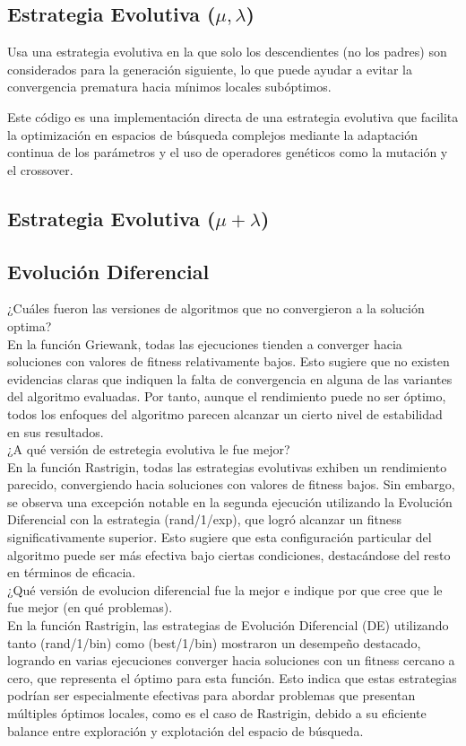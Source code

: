 \documentclass{report}
\begin{document}
\subsection{Estrategia Evolutiva ($\mu , \lambda$)}
Usa una estrategia evolutiva en la que solo los descendientes (no los padres) son considerados para la generación siguiente, lo que puede ayudar a evitar la convergencia prematura hacia mínimos locales subóptimos.

Este código es una implementación directa de una estrategia evolutiva que facilita la optimización en espacios de búsqueda complejos mediante la adaptación continua de los parámetros y el uso de operadores genéticos como la mutación y el crossover.
\subsection{Estrategia Evolutiva ($\mu + \lambda$)}


\subsection{Evolución Diferencial}


¿Cuáles fueron las versiones de algoritmos que no convergieron a la solución optima?\\
En la función Griewank, todas las ejecuciones tienden a converger hacia soluciones con valores de fitness relativamente bajos. Esto sugiere que no existen evidencias claras que indiquen la falta de convergencia en alguna de las variantes del algoritmo evaluadas. Por tanto, aunque el rendimiento puede no ser óptimo, todos los enfoques del algoritmo parecen alcanzar un cierto nivel de estabilidad en sus resultados.\\
¿A qué versión de estretegia evolutiva le fue mejor?\\
En la función Rastrigin, todas las estrategias evolutivas exhiben un rendimiento parecido, convergiendo hacia soluciones con valores de fitness bajos. Sin embargo, se observa una excepción notable en la segunda ejecución utilizando la Evolución Diferencial con la estrategia (rand/1/exp), que logró alcanzar un fitness significativamente superior. Esto sugiere que esta configuración particular del algoritmo puede ser más efectiva bajo ciertas condiciones, destacándose del resto en términos de eficacia.\\
¿Qué versión de evolucion diferencial fue la mejor e indique por que cree que le fue mejor (en qué problemas).\\
En la función Rastrigin, las estrategias de Evolución Diferencial (DE) utilizando tanto (rand/1/bin) como (best/1/bin) mostraron un desempeño destacado, logrando en varias ejecuciones converger hacia soluciones con un fitness cercano a cero, que representa el óptimo para esta función. Esto indica que estas estrategias podrían ser especialmente efectivas para abordar problemas que presentan múltiples óptimos locales, como es el caso de Rastrigin, debido a su eficiente balance entre exploración y explotación del espacio de búsqueda.
\end{document}

